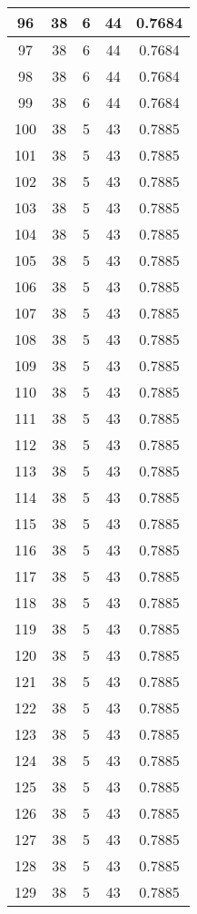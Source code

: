\documentclass[letterpaper, 12pt]{article}
\begin{document}
\begin{longtable}{|c|c|c|c|c|}
\hline
96 & 38 & 6 & 44 & 0.7684 \\
\hline
97 & 38 & 6 & 44 & 0.7684 \\
\hline
98 & 38 & 6 & 44 & 0.7684 \\
\hline
99 & 38 & 6 & 44 & 0.7684 \\
\hline
100 & 38 & 5 & 43 & 0.7885 \\
\hline
101 & 38 & 5 & 43 & 0.7885 \\
\hline
102 & 38 & 5 & 43 & 0.7885 \\
\hline
103 & 38 & 5 & 43 & 0.7885 \\
\hline
104 & 38 & 5 & 43 & 0.7885 \\
\hline
105 & 38 & 5 & 43 & 0.7885 \\
\hline
106 & 38 & 5 & 43 & 0.7885 \\
\hline
107 & 38 & 5 & 43 & 0.7885 \\
\hline
108 & 38 & 5 & 43 & 0.7885 \\
\hline
109 & 38 & 5 & 43 & 0.7885 \\
\hline
110 & 38 & 5 & 43 & 0.7885 \\
\hline
111 & 38 & 5 & 43 & 0.7885 \\
\hline
112 & 38 & 5 & 43 & 0.7885 \\
\hline
113 & 38 & 5 & 43 & 0.7885 \\
\hline
114 & 38 & 5 & 43 & 0.7885 \\
\hline
115 & 38 & 5 & 43 & 0.7885 \\
\hline
116 & 38 & 5 & 43 & 0.7885 \\
\hline
117 & 38 & 5 & 43 & 0.7885 \\
\hline
118 & 38 & 5 & 43 & 0.7885 \\
\hline
119 & 38 & 5 & 43 & 0.7885 \\
\hline
120 & 38 & 5 & 43 & 0.7885 \\
\hline
121 & 38 & 5 & 43 & 0.7885 \\
\hline
122 & 38 & 5 & 43 & 0.7885 \\
\hline
123 & 38 & 5 & 43 & 0.7885 \\
\hline
124 & 38 & 5 & 43 & 0.7885 \\
\hline
125 & 38 & 5 & 43 & 0.7885 \\
\hline
126 & 38 & 5 & 43 & 0.7885 \\
\hline
127 & 38 & 5 & 43 & 0.7885 \\
\hline
128 & 38 & 5 & 43 & 0.7885 \\
\hline
129 & 38 & 5 & 43 & 0.7885 \\

\end{longtable}
\end{document}
